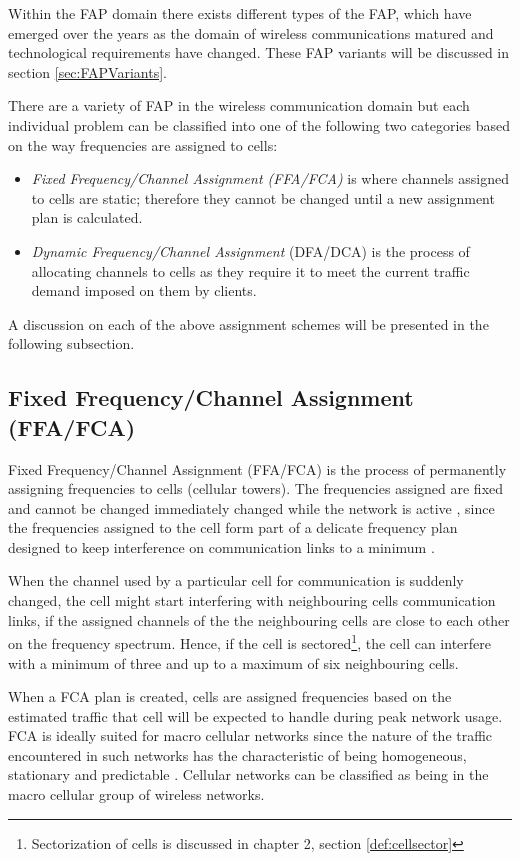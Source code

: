 Within the FAP domain there exists different types of the FAP, which have emerged over the years as the domain of wireless communications matured and technological requirements have changed. These FAP variants will be discussed in section \ref{sec:FAPVariants}.

There are a variety of FAP in the wireless communication domain but each individual problem can be classified into one of the following two categories based on the way frequencies are assigned to cells:
\begin{itemize}
\item \emph{Fixed Frequency/Channel Assignment (FFA/FCA)} is where channels assigned to cells are static; therefore they cannot be changed until a new assignment plan is calculated.
\item \emph{Dynamic Frequency/Channel Assignment} (DFA/DCA) is the process of allocating channels to cells as they require it to meet the current traffic demand imposed on them by clients. 
\end{itemize}

A discussion on each of the above assignment schemes will be presented in the following subsection.
\subsection{Fixed Frequency/Channel Assignment (FFA/FCA)}
Fixed Frequency/Channel Assignment (FFA/FCA) is the process of permanently assigning frequencies to cells (cellular towers). The frequencies assigned are fixed and cannot be changed immediately changed while the network is active , since the frequencies assigned to the cell form part of a delicate frequency plan designed to keep interference on communication links to a minimum \cite{PrinciplesMobileCommunication}. 

When the channel used by a particular cell for communication is suddenly changed, the cell might start interfering with neighbouring cells communication links, if the assigned channels of the the neighbouring cells are close to each other on the frequency spectrum. Hence, if the cell is sectored\footnote{Sectorization of cells is discussed in chapter 2, section \ref{def:cellsector}}, the cell can interfere with a minimum of three and up to a maximum of six neighbouring cells\cite{PrinciplesMobileCommunication}.

When a FCA plan is created, cells are assigned frequencies based on the estimated traffic that cell will be expected to handle during peak network usage. FCA is ideally suited for macro cellular networks since the nature of the traffic encountered in such networks has the characteristic of being homogeneous, stationary and predictable \cite{PrinciplesMobileCommunication}. Cellular networks can be classified as being in the macro cellular group of wireless networks.

